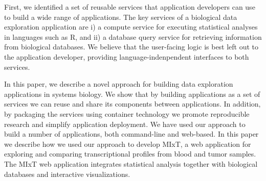 First, we identified a set of reusable services that application developers can
use to build a wide range of applications. The key services of a biological data
exploration application are i) a compute service for executing statistical
analyses in languages such as R, and ii) a database query service for retrieving
information from biological databases. We believe that the user-facing logic is
best left out to the application developer, providing language-indenpendent
interfaces to both services. 

In this paper, we describe a novel approach for building data exploration
applications in systems biology. We show that by building applications as a set
of services we can reuse and share its components between
applications. In addition, by packaging the services using container technology
we promote reproducible research and simplify application deployment. We have
used our approach to build a number of applications, both command-line and
web-based. In this paper we describe how we used our approach to develop MIxT,
a web application for exploring and comparing transcriptional profiles from
blood and tumor samples. The MIxT web application integrates statistical
analysis together with biological databases and interactive visualizations.

